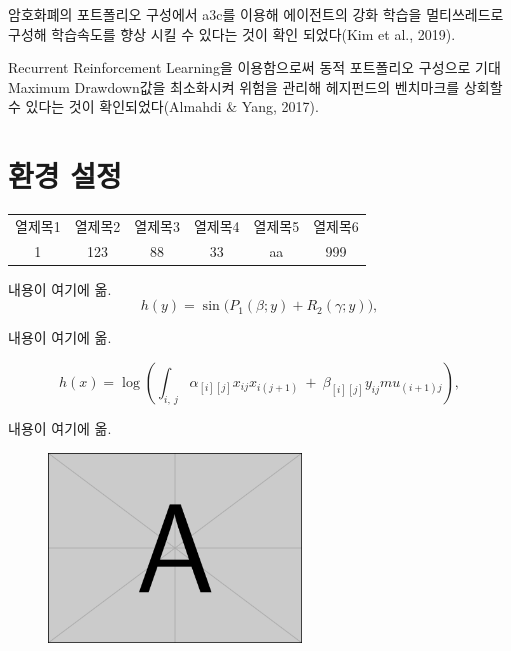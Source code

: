 \documentclass[a4paper]{article}
\begin{document}
암호화폐의 포트폴리오 구성에서 a3c를 이용해 에이전트의 강화 학습을 멀티쓰레드로 구성해 학습속도를 향상 시킬 수 있다는 것이 확인 되었다(Kim et al., 2019).

Recurrent Reinforcement Learning을 이용함으로써 동적 포트폴리오 구성으로 기대 Maximum Drawdown값을 최소화시켜 위험을 관리해 헤지펀드의 벤치마크를 상회할 수 있다는 것이 확인되었다(Almahdi & Yang, 2017).

\section{환경 설정}



\begin{table}[!ht]
\label{tbl:data}
\begin{center}
{\scriptsize
{}

\begin{tabular}{cccccc} \hline \hline 
\multicolumn{1}{c}{열제목1} & \multicolumn{1}{c}{열제목2} & \multicolumn{1}{c}{열제목3} & \multicolumn{1}{c}{열제목4} & \multicolumn{1}{c}{열제목5} & \multicolumn{1}{c}{열제목6} \\ \cline{1-6}
\multicolumn{1}{c}{1} & \multicolumn{1}{c}{123} & \multicolumn{1}{c}{88} & \multicolumn{1}{c}{33} & \multicolumn{1}{c}{aa} & \multicolumn{1}{c}{999} \\ 
\hline 
\end{tabular}
}
\end{center}
\end{table}


내용이 여기에 옮.
\begin{equation*}
h (y) = \sin \biggl (P_1 (\beta;y) + R_2 (\gamma;y) \biggr),
\end{equation*}
 
 내용이 여기에 옮.
  
 \begin{equation} \label{model}
h (x) = \log \left ( \int_{i,\ j} \alpha_{[i][j]} x_{ij} x_{i (j+1)} \ + \ \beta_{[i][j]} y_{ij} mu_{ (i+1)j} \right),
\end{equation}

내용이 여기에 옮.
 
 \begin{figure}[!ht]
	\centering
	\includegraphics[width=0.6\textwidth]{figure1_1}  
	\begin{center}
	\end{center}
	\label{fig1:data}
\end{figure}
\end{document}
